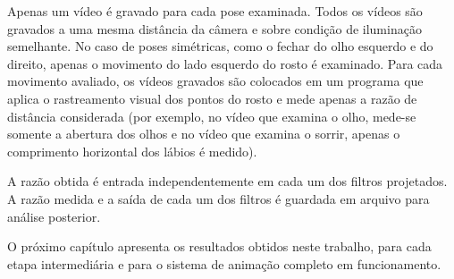 Apenas um vídeo é gravado para cada pose examinada. Todos os vídeos são gravados
a uma mesma distância da câmera e sobre condição de iluminação semelhante. No
caso de poses simétricas, como o fechar do olho esquerdo e do direito, apenas o
movimento do lado esquerdo do rosto é examinado. Para cada movimento avaliado,
os vídeos gravados são colocados em um programa que aplica o rastreamento visual
dos pontos do rosto e mede apenas a razão de distância considerada (por exemplo,
no vídeo que examina o olho, mede-se somente a abertura dos olhos e no vídeo que
examina o sorrir, apenas o comprimento horizontal dos lábios é medido). 

A razão obtida é entrada independentemente em cada um dos filtros projetados. A
razão medida e a saída de cada um dos filtros é guardada em arquivo para análise
posterior.

O próximo capítulo apresenta os resultados obtidos neste trabalho, para cada etapa 
intermediária e para o sistema de animação completo em funcionamento.


